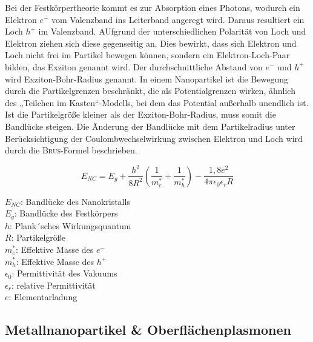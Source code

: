 	Bei der Festkörpertheorie kommt es zur Absorption eines Photons, wodurch ein Elektron $e^{-}$ vom Valenzband ins Leiterband angeregt wird.
	Daraus resultiert ein Loch $h^{+}$  im Valenzband. 
	AUfgrund der unterschiedlichen Polarität von Loch und Elektron ziehen sich diese gegenseitig an. 
	Dies bewirkt, dass sich Elektron und Loch nicht frei im Partikel bewegen können, sondern ein Elektron-Loch-Paar bilden, das Exziton genannt wird. 
	Der durchschnittliche Abstand von $e^{-}$ und $h^{+}$ wird Exziton-Bohr-Radius genannt.
	In einem Nanopartikel ist die Bewegung durch die Partikelgrenzen beschränkt, die als Potentialgrenzen wirken, ähnlich des „Teilchen im Kasten“-Modells, bei dem das Potential außerhalb unendlich ist.
	Ist die Partikelgröße kleiner als der Exziton-Bohr-Radius, muss somit die Bandlücke steigen.
	Die Änderung der Bandlücke mit dem Partikelradius unter Berücksichtigung der  Coulombwechselwirkung zwischen Elektron und Loch wird durch die \textsc{Brus}-Formel beschrieben.\autocite{Brus1984}
	
	\begin{equation}
	\label{eq:BRUS}
	E_{NC}=E_{g}+\frac{h^{2}}{8R^{2}}\left( \frac{1}{m^{*}_{e}}+\frac{1}{m^{*}_{h}}\right)-\frac{1,8e^{2}}{4\pi\epsilon_{0}\epsilon_{r}R} 
	\end{equation}
	\begin{multicols}{2}
		\begin{flushleft}
			$E_{NC}$:	Bandlücke des Nanokristalls\\
			$E_{g}$:	Bandlücke des Festkörpers\\
			$h$:		Plank´sches Wirkungsquantum\\
			$R$:		Partikelgröße\\
			$m^{*}_{e}$: Effektive Masse des $e^{-}$\\
			$m^{*}_{h}$: Effektive Masse des $h^{+}$\\
			$\epsilon_{0}$: Permittivität des Vakuums\\
			$\epsilon_{r}$: relative Permittivität\\
			$e$: Elementarladung\\
		\end{flushleft}
	\end{multicols}
	

    \subsection{Metallnanopartikel \& Oberflächenplasmonen}
    

